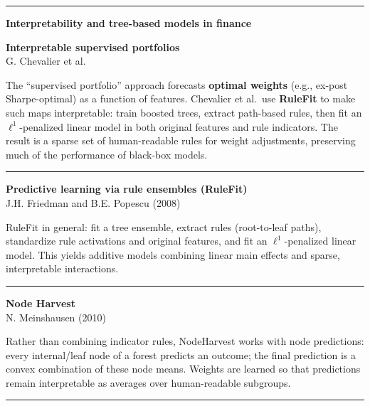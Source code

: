 \documentclass[a5paper]{article}
\def\subsection#1{{\par\bigskip\goodbreak\large\bfseries #1\par}}
\begin{document}
\begin{center}\rule{0.5\linewidth}{0.5pt}\end{center}

\subsection{Interpretability and tree-based models in
finance}\label{interpretability-and-treebased-models-in-finance}

\textbf{Interpretable supervised portfolios}\\
G. Chevalier et al.

The ``supervised portfolio'' approach forecasts \textbf{optimal weights}
(e.g., ex-post Sharpe-optimal) as a function of features. Chevalier et
al.~use \textbf{RuleFit} to make such maps interpretable: train boosted
trees, extract path-based rules, then fit an $\ell^1$-penalized linear model
in both original features and rule indicators. The result is a sparse
set of human-readable rules for weight adjustments, preserving much of
the performance of black-box models.

\begin{center}\rule{0.5\linewidth}{0.5pt}\end{center}

\textbf{Predictive learning via rule ensembles (RuleFit)}\\
J.H. Friedman and B.E. Popescu (2008)

RuleFit in general: fit a tree ensemble, extract rules (root-to-leaf
paths), standardize rule activations and original features, and fit an
$\ell^1$-penalized linear model. This yields additive models combining linear
main effects and sparse, interpretable interactions.

\begin{center}\rule{0.5\linewidth}{0.5pt}\end{center}

\textbf{Node Harvest}\\
N. Meinshausen (2010)

Rather than combining indicator rules, NodeHarvest works with node
predictions: every internal/leaf node of a forest predicts an outcome;
the final prediction is a convex combination of these node means.
Weights are learned so that predictions remain interpretable as averages
over human-readable subgroups.

\begin{center}\rule{0.5\linewidth}{0.5pt}\end{center}
\end{document}
